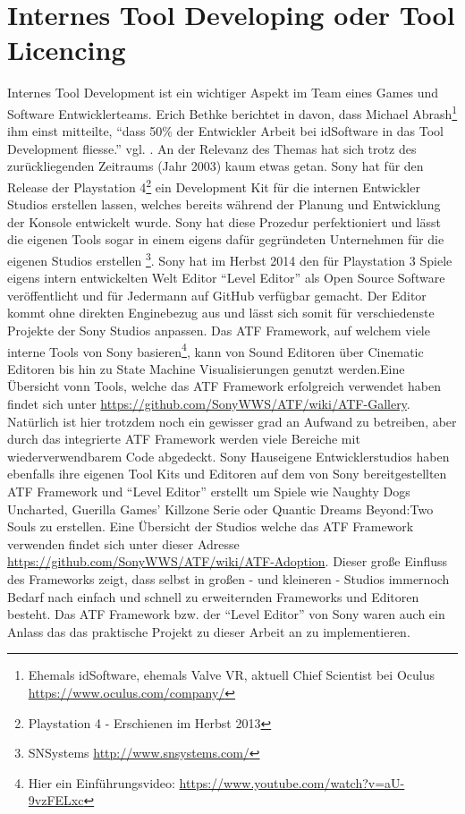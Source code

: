 \documentclass[pagesize, paper=a4, fontsize=12pt, titlepage=true, headings=small, headnosepline, abstractoff, liststotoc, nochapterprefix, plainheadsepline, twoside]{scrreprt}
\begin{document}
\section{Internes Tool Developing oder Tool Licencing}
Internes Tool Development ist ein wichtiger Aspekt im Team eines Games und Software Entwicklerteams. Erich Bethke \autocite{Bethke2003} berichtet  in davon, dass Michael Abrash\footnote{Ehemals idSoftware, ehemals Valve VR, aktuell Chief Scientist bei Oculus \url{https://www.oculus.com/company/}} ihm einst mitteilte, “dass 50\% der Entwickler Arbeit bei idSoftware in das Tool Development fliesse.” vgl. . An der Relevanz des Themas hat sich trotz des zurückliegenden Zeitraums (Jahr 2003) kaum etwas getan. Sony hat für den Release der Playstation 4\footnote{Playstation 4 - Erschienen im Herbst 2013} ein Development Kit  für die internen Entwickler Studios  erstellen lassen, welches bereits während der Planung und Entwicklung der Konsole entwickelt wurde. Sony hat diese Prozedur perfektioniert und lässt die eigenen Tools sogar in einem eigens dafür gegründeten Unternehmen für die eigenen Studios erstellen \footnote{SNSystems \url{http://www.snsystems.com/}}. Sony hat im Herbst 2014 den für Playstation 3 Spiele eigens intern entwickelten Welt Editor “Level Editor” als Open Source Software veröffentlicht und für Jedermann auf GitHub verfügbar gemacht. Der Editor kommt ohne direkten Enginebezug aus und lässt sich somit für verschiedenste Projekte der Sony Studios anpassen. Das ATF Framework, auf welchem viele interne Tools von Sony basieren\footnote{Hier ein Einführungsvideo: \url{https://www.youtube.com/watch?v=aU-9vzFELxc}}, kann von Sound Editoren über Cinematic Editoren bis hin zu State Machine Visualisierungen genutzt werden.Eine Übersicht vonn Tools, welche das ATF Framework erfolgreich verwendet haben findet sich unter \url{https://github.com/SonyWWS/ATF/wiki/ATF-Gallery}. Natürlich ist hier trotzdem noch ein gewisser grad an Aufwand zu betreiben, aber durch das integrierte ATF Framework werden viele Bereiche mit wiederverwendbarem Code abgedeckt. Sony Hauseigene  Entwicklerstudios haben ebenfalls ihre eigenen Tool Kits und Editoren auf dem von Sony bereitgestellten ATF Framework und “Level Editor” erstellt um Spiele wie Naughty Dogs Uncharted, Guerilla Games’ Killzone Serie oder Quantic Dreams Beyond:Two Souls zu erstellen. Eine Übersicht der Studios welche das ATF Framework verwenden findet sich unter dieser Adresse \url{https://github.com/SonyWWS/ATF/wiki/ATF-Adoption}. Dieser große Einfluss des Frameworks zeigt, dass selbst in großen - und kleineren - Studios immernoch Bedarf nach einfach und schnell zu erweiternden Frameworks und Editoren besteht. Das ATF Framework bzw. der “Level Editor” von Sony waren auch ein Anlass das das praktische Projekt zu dieser Arbeit an zu implementieren.
\end{document}
